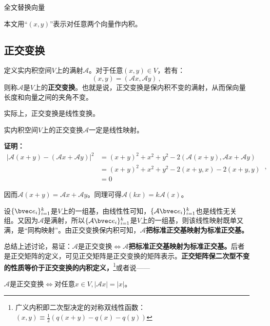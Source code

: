 

\begin{issues}
\issueDraft 全文替换向量
\end{issues}

本文用“$(x,y)$”表示对任意两个向量作内积。
\subsection{正交变换}
\begin{definition}{}
定义实内积空间$V$上的满射$\mathcal A$。对于任意$(x,y)\in V$，若有：
\begin{equation}
(x,y)=(\mathcal A x,\mathcal A y)~,
\end{equation}
则称$\mathcal A$是$V$上的\textbf{正交变换}。也就是说，正交变换是保内积不变的满射，从而保向量长度和向量之间的夹角不变。
\end{definition}
实际上，正交变换是线性变换。
\begin{theorem}{}
实内积空间$V$上的正交变换$\mathcal A$一定是线性映射。
\end{theorem}
\textbf{证明：}
\begin{equation}
\begin{aligned}
|\mathcal A(x+y)-(\mathcal Ax+\mathcal Ay)|^2&=(x+y)^2+x^2+y^2-2\left(\mathcal A(x+y),\mathcal Ax+\mathcal Ay\right)\\
&=(x+y)^2+x^2+y^2-2(x+y,x)-2(x+y,y)\\
&=0
\end{aligned}
~,\end{equation}

因而$\mathcal A(x+y)=\mathcal Ax+\mathcal Ay$。同理可得$\mathcal A(kx)=k\mathcal A(x)$。

设$\{\bvec e_i\}^k_{i=1}$是$V$上的一组基，由线性性可知，$\{\mathcal A\bvec e_i\}^k_{i=1}$也是线性无关组。又因为$\mathcal A$是满射，所以$\{\mathcal A\bvec e_i\}^k_{i=1}$是$V$上的一组基，则该线性映射既单又满，是“同构映射”。由正交变换保内积可知，$\mathcal A$\textbf{把标准正交基映射为标准正交基。}

总结上述讨论，易证：$\mathcal A$是正交变换$\Longleftrightarrow \mathcal A$\textbf{把标准正交基映射为标准正交基。}后者是正交矩阵的定义，可见正交矩阵是正交变换的矩阵表示。\textbf{正交矩阵保二次型不变的性质等价于正交变换的内积定义，}\footnote{广义内积即二次型决定的对称双线性函数：$(x,y)\equiv \frac{1}{2}(q(x+y)-q(x)-q(y))$}或者说——

$\mathcal A$是正交变换$\Longleftrightarrow $对任意$x\in V,|\mathcal Ax|=|x|$。

